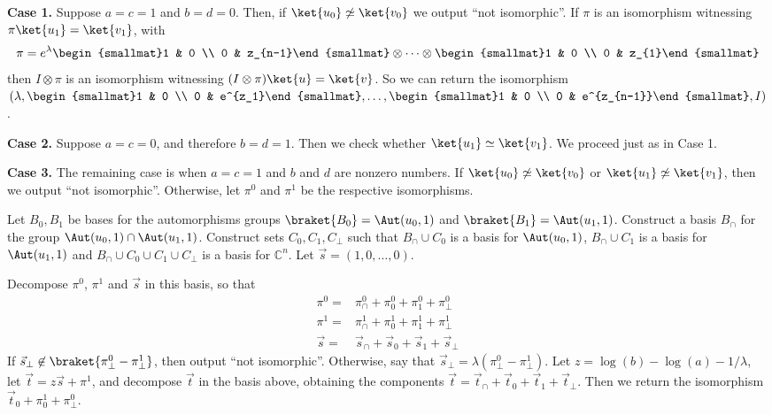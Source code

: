 \textbf{Case 1. }
Suppose $a=c=1$ and $b=d=0$.
Then, if $\ket{u_0}\not\simeq\ket{v_0}$ we output ``not isomorphic''.
If $\pi$ is an isomorphism witnessing $\pi\ket{u_1}=\ket{v_1}$, with
\begin{align}
\pi = e^\lambda\begin{smallmat}1 & 0 \\ 0 & z_{n-1}\end{smallmat}\otimes \cdots\otimes \begin{smallmat}1 & 0 \\ 0 & z_{1}\end{smallmat}
\end{align}
then $I\otimes \pi$ is an isomorphism witnessing $(I\otimes\pi)\ket{u}=\ket{v}$.
So we can return the isomorphism $(\lambda,\begin{smallmat}1 & 0 \\ 0 & e^{z_1}\end{smallmat},\ldots, \begin{smallmat}1 & 0 \\ 0 & e^{z_{n-1}}\end{smallmat},I)$.

\textbf{Case 2. }
Suppose $a=c=0$, and therefore $b=d=1$.
Then we check whether $\ket{u_1}\simeq\ket{v_1}$.
We proceed just as in Case 1.

\textbf{Case 3. }
The remaining case is when $a=c=1$ and $b$ and $d$ are nonzero numbers.
If $\ket{u_0}\not\simeq \ket{v_0}$ or $\ket{u_1}\not\simeq\ket{v_1}$, then we output ``not isomorphic''.
Otherwise, let $\pi^0$ and $\pi^1$ be the respective isomorphisms.

Let $B_0,B_1$ be bases for the automorphisms groups $\braket{B_0}=\Aut(u_0,1)$ and $\braket{B_1}=\Aut(u_1,1)$.
Construct a basis $B_\cap$ for the group $\Aut(u_0,1)\cap \Aut(u_1,1)$.
Construct sets $C_0,C_1,C_\bot$ such that $B_\cap\cup C_0$ is a basis for $\Aut(u_0,1)$, $B_\cap\cup C_1$ is a basis for $\Aut(u_1,1)$ and $B_\cap\cup C_0\cup C_1\cup C_\bot$ is a basis for $\mathbb C^n$.
Let $\vec{s}=(1,0,\ldots, 0)$.

Decompose $\pi^0$, $\pi^1$ and $\vec{s}$ in this basis, so that
\begin{align}
\pi^0=&\pi_\cap^0+\pi_0^0+\pi_1^0+\pi_\bot^0 \\
\pi^1=&\pi_\cap^1+\pi_0^1+\pi_1^1+\pi_\bot^1 \\
\vec{s}=&\vec s_\cap+\vec s_0+\vec s_1+\vec s_\bot
\end{align}
If $\vec s_\bot\not\in \braket{\pi_\bot^0-\pi_\bot^1}$, then output ``not isomorphic''.
Otherwise, say that $\vec{s}_\bot=\lambda(\pi_\bot^0-\pi_\bot^1)$.
Let $z=\log(b)-\log(a)-1/\lambda$, let $\vec{t}=z\vec{s}+\pi^1$, and decompose $\vec t$ in the basis above, obtaining the components $\vec t = \vec t_\cap + \vec t_0+\vec t_1+\vec t_\bot$.
Then we return the isomorphism $\vec t_0+\pi_0^1+\pi_\bot^0$.


